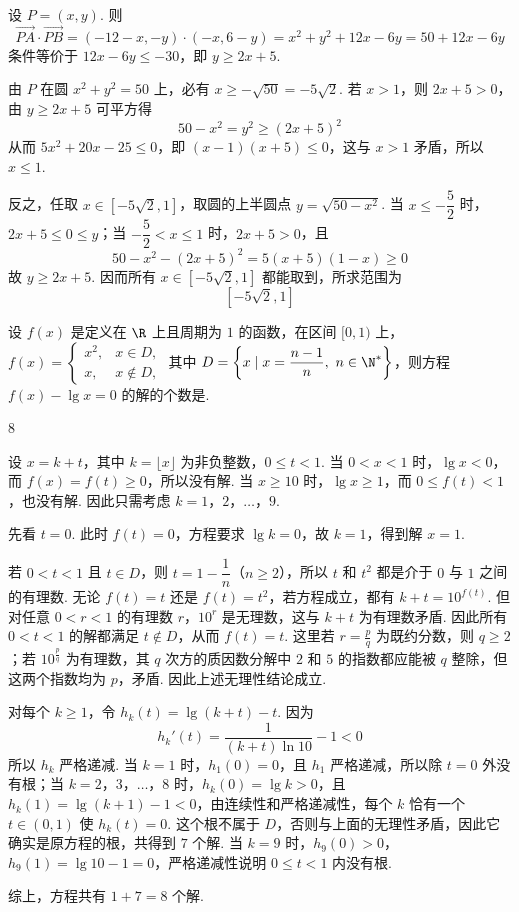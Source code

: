 \begin{solution}
设 \(P=(x,y)\). 则
\[
\overrightarrow{PA}\cdot\overrightarrow{PB}=(-12-x,-y)\cdot(-x,6-y)=x^2+y^2+12x-6y=50+12x-6y
\]
条件等价于 \(12x-6y\le-30\)，即 \(y\ge2x+5\).

由 \(P\) 在圆 \(x^2+y^2=50\) 上，必有 \(x\ge-\sqrt{50}=-5\sqrt2\). 若 \(x>1\)，则 \(2x+5>0\)，由 \(y\ge2x+5\) 可平方得
\[
50-x^2=y^2\ge(2x+5)^2
\]
从而 \(5x^2+20x-25\le0\)，即 \((x-1)(x+5)\le0\)，这与 \(x>1\) 矛盾，所以 \(x\le1\).

反之，任取 \(x\in[-5\sqrt2,1]\)，取圆的上半圆点 \(y=\sqrt{50-x^2}\). 当 \(x\le-\dfrac52\) 时，\(2x+5\le0\le y\)；当 \(-\dfrac52<x\le1\) 时，\(2x+5>0\)，且
\[
50-x^2-(2x+5)^2=5(x+5)(1-x)\ge0
\]
故 \(y\ge2x+5\). 因而所有 \(x\in[-5\sqrt2,1]\) 都能取到，所求范围为
\[
[-5\sqrt2,1]
\]
\end{solution}



\begin{problem}
设 \(f(x)\) 是定义在 \(\R\) 上且周期为 \(1\) 的函数，在区间 \([0,1)\) 上，\(f(x)=\begin{cases}
x^2,&x\in D,\\
x,&x\notin D,
\end{cases}\) 其中 \(D=\left\{x\mid x=\dfrac{n-1}{n},\ n\in \N^*\right\}\)，则方程 \(f(x)-\lg x=0\) 的解的个数是\fillinblank{}.
\end{problem}

\begin{answer}
\(8\)
\end{answer}

\begin{solution}
设 \(x=k+t\)，其中 \(k=\lfloor x\rfloor\) 为非负整数，\(0\le t<1\). 当 \(0<x<1\) 时，\(\lg x<0\)，而 \(f(x)=f(t)\ge0\)，所以没有解. 当 \(x\ge10\) 时，\(\lg x\ge1\)，而 \(0\le f(t)<1\)，也没有解. 因此只需考虑 \(k=1\)，\(2\)，\(\ldots\)，\(9\).

先看 \(t=0\). 此时 \(f(t)=0\)，方程要求 \(\lg k=0\)，故 \(k=1\)，得到解 \(x=1\).

若 \(0<t<1\) 且 \(t\in D\)，则 \(t=1-\dfrac1n\)（\(n\ge2\)），所以 \(t\) 和 \(t^2\) 都是介于 \(0\) 与 \(1\) 之间的有理数. 无论 \(f(t)=t\) 还是 \(f(t)=t^2\)，若方程成立，都有 \(k+t=10^{f(t)}\). 但对任意 \(0<r<1\) 的有理数 \(r\)，\(10^r\) 是无理数，这与 \(k+t\) 为有理数矛盾. 因此所有 \(0<t<1\) 的解都满足 \(t\notin D\)，从而 \(f(t)=t\).
这里若 \(r=\frac{p}{q}\) 为既约分数，则 \(q\ge2\)；若 \(10^{\frac{p}{q}}\) 为有理数，其 \(q\) 次方的质因数分解中 \(2\) 和 \(5\) 的指数都应能被 \(q\) 整除，但这两个指数均为 \(p\)，矛盾. 因此上述无理性结论成立.

对每个 \(k\ge1\)，令 \(h_k(t)=\lg(k+t)-t\). 因为
\[
h_k'(t)=\frac1{(k+t)\ln10}-1<0
\]
所以 \(h_k\) 严格递减. 当 \(k=1\) 时，\(h_1(0)=0\)，且 \(h_1\) 严格递减，所以除 \(t=0\) 外没有根；当 \(k=2\)，\(3\)，\(\ldots\)，\(8\) 时，\(h_k(0)=\lg k>0\)，且 \(h_k(1)=\lg(k+1)-1<0\)，由连续性和严格递减性，每个 \(k\) 恰有一个 \(t\in(0,1)\) 使 \(h_k(t)=0\). 这个根不属于 \(D\)，否则与上面的无理性矛盾，因此它确实是原方程的根，共得到 \(7\) 个解. 当 \(k=9\) 时，\(h_9(0)>0\)，\(h_9(1)=\lg10-1=0\)，严格递减性说明 \(0\le t<1\) 内没有根.

综上，方程共有 \(1+7=8\) 个解.
\end{solution}


